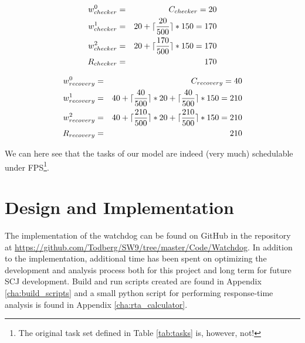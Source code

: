 \begin{eqnarray}
    w_{checker}^0 &=& C_{checker} = 20 \nonumber \\ 
    w_{checker}^1 &=& 20 + \lceil\frac{20}{500}\rceil*150 = 170 \nonumber \\ 
    w_{checker}^2 &=& 20 + \lceil\frac{170}{500}\rceil*150 = 170 \nonumber \\
    R_{checker} &=& 170
\end{eqnarray}

\begin{eqnarray}
    w_{recovery}^0 &=& C_{recovery} = 40 \nonumber \\ 
    w_{recovery}^1 &=& 40 + \lceil\frac{40}{500}\rceil*20 + \lceil\frac{40}{500}\rceil*150 = 210 \nonumber \\ 
    w_{recovery}^2 &=& 40 + \lceil\frac{210}{500}\rceil*20 + \lceil\frac{210}{500}\rceil*150 = 210 \nonumber \\
    R_{recovery} &=& 210
\end{eqnarray}

We can here see that the tasks of our model are indeed (very much) schedulable under FPS\footnote{The original task set defined in Table \ref{tab:tasks} is, however, not!}.

\chapter{Design and Implementation}
The implementation of the watchdog can be found on GitHub in the repository at \url{https://github.com/Todberg/SW9/tree/master/Code/Watchdog}. In addition to the implementation, additional time has been spent on optimizing the development and analysis process both for this project and long term for future SCJ development. Build and run scripts created are found in Appendix \ref{cha:build_scripts} and a small python script for performing response-time analysis is found in Appendix \ref{cha:rta_calculator}.

